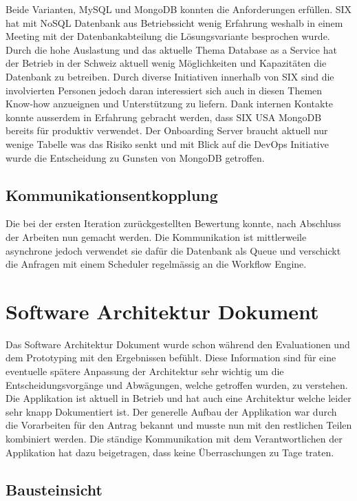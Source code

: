 Beide Varianten, MySQL und MongoDB konnten die Anforderungen erfüllen. SIX hat mit NoSQL Datenbank aus Betriebssicht wenig Erfahrung weshalb in einem Meeting mit der Datenbankabteilung die Lösungsvariante besprochen wurde. Durch die hohe Auslastung und das aktuelle Thema Database as a Service hat der Betrieb in der Schweiz aktuell wenig Möglichkeiten und Kapazitäten die Datenbank zu betreiben. Durch diverse Initiativen innerhalb von SIX sind die involvierten Personen jedoch daran interessiert sich auch in diesen Themen Know-how anzueignen und Unterstützung zu liefern. Dank internen Kontakte konnte ausserdem in Erfahrung gebracht werden, dass SIX USA MongoDB bereits für produktiv verwendet. Der Onboarding Server braucht aktuell nur wenige Tabelle was das Risiko senkt und mit Blick auf die DevOps Initiative wurde die Entscheidung zu Gunsten von MongoDB getroffen.

\subsection{Kommunikationsentkopplung}

Die bei der ersten Iteration zurückgestellten Bewertung konnte, nach Abschluss der Arbeiten nun gemacht werden. Die Kommunikation ist mittlerweile asynchrone jedoch verwendet sie dafür die Datenbank als Queue und verschickt die Anfragen mit einem Scheduler regelmässig an die Workflow Engine.

\section{Software Architektur Dokument}

Das Software Architektur Dokument wurde schon während den Evaluationen und dem Prototyping mit den Ergebnissen befühlt. Diese Information sind für eine eventuelle spätere Anpassung der Architektur sehr wichtig um die Entscheidungsvorgänge und Abwägungen, welche getroffen wurden, zu verstehen. Die Applikation ist aktuell in Betrieb und hat auch eine Architektur welche leider sehr knapp Dokumentiert ist. Der generelle Aufbau der Applikation war durch die Vorarbeiten für den Antrag bekannt und musste nun mit den restlichen Teilen kombiniert werden. Die ständige Kommunikation mit dem Verantwortlichen der Applikation hat dazu beigetragen, dass keine Überraschungen zu Tage traten.

\subsection{Bausteinsicht}

